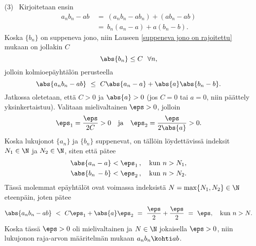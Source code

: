  (3) \ Kirjoitetaan ensin
\begin{align*}
a_n b_n - ab\ &=\ (a_n b_n - a b_n) + (a b_n - ab) \\
              &=\ b_n(a_n - a) + a(b_n - b).
\end{align*} 
Koska $\{b_n\}$ on suppeneva jono, niin Lauseen \ref{suppeneva jono on rajoitettu} mukaan on 
jollakin $C$
\[
\abs{b_n} \le C\ \ \forall n,
\]
jolloin kolmioepäyhtälön perusteella
\[
\abs{a_n b_n - ab}\ \le\ C \abs{a_n - a} + \abs{a} \abs{b_n - b}.
\]
Jatkossa oletetaan, että $C > 0$ ja $\abs{a} > 0$ (jos $C=0$ tai $a=0$, niin päättely
yksinkertaistuu). Valitaan mielivaltainen $\eps > 0$, jolloin
\[
\eps_1 = \frac{\eps}{2C} > 0 \quad \text{ja} \quad \eps_2 = \frac{\eps}{2\abs{a}} > 0.
\]
Koska lukujonot $\{a_n\}$ ja $\{b_n\}$ suppenevat, on tällöin löydettävissä indeksit 
\mbox{$N_1 \in \N$} ja $N_2 \in \N$, siten että 
pätee
\begin{align*}
\abs{a_n - a}  &< \eps_1\,, \quad \text{kun}\ n > N_1, \\
\abs{b_n\,- b} &< \eps_2\,, \quad \text{kun}\ n > N_2.
\end{align*}
Tässä molemmat epäyhtälöt ovat voimassa indeksistä $N = \max\{N_1,N_2\}\in\N$ eteenpäin,
joten pätee
\[
\abs{a_n b_n - ab}\ <\ C \eps_1 + \abs{a} \eps_2\ 
                    =\ \frac{\eps}{2} + \frac{\eps}{2}\ =\ \eps, \quad \text{kun}\ n > N. 
\]
Koska tässä $\eps > 0$ oli mielivaltainen ja $N\in\N$ jokaisella $\eps>0$, niin lukujonon
raja-arvon määritelmän mukaan $a_n b_n \kohti ab$. \loppu

